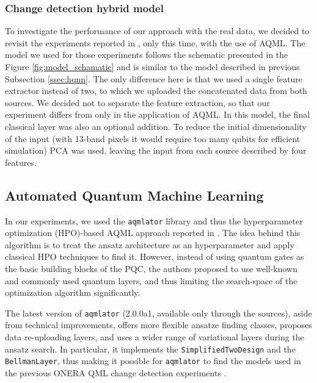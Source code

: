 \documentclass[runningheads]{llncs}
\begin{document}




\subsubsection{Change detection hybrid model}
\label{sssec:qml_onera}


To investigate the performance of our approach with the real data, we decided to revisit the experiments reported in
\cite{QMLCaseStudy}, only this time, with the use of AQML. The model we used for those experiments follows the
schematic presented in the Figure \ref{fig:model_schamatic} and is similar to the model described in previous Subsection
\ref{ssec:hqnn}. The only difference here is that we used a single feature extractor instead of two, to which we uploaded
the concatenated data from both sources. We decided not to separate the feature extraction, so that our experiment
differs from \cite{QMLCaseStudy} only in the application of AQML. In this model, the final classical layer was also
an optional addition. To reduce the initial dimensionality of the input (with 13-band pixels it would require too many
qubits for efficient simulation) PCA was used, leaving the input from each source described by four features.



\subsection{Automated Quantum Machine Learning}

In our experiments, we used the \texttt{aqmlator} library and thus the hyperparameter optimization (HPO)-based AQML
approach reported in \cite{Rybotycki_2025}. The idea behind this algorithm is to treat the ansatz architecture as an
hyperparameter and apply classical HPO techniques to find it. However, instead of using quantum gates as the basic
building blocks of the PQC, the authors proposed to use well-known and commonly used quantum layers, and thus limiting
the search-space of the optimization algorithm significantly.

The latest version of \texttt{aqmlator} (2.0.0a1, available only through the sources), aside from technical
improvements, offers more flexible ansatze finding classes, proposes data re-uploading layers, and uses a wider range
of variational layers during the ansatz search. In particular, it implements the \texttt{SimplifiedTwoDesign} and the
\texttt{BellmanLayer}, thus making it possible for \texttt{aqmlator} to find the models used in the previous ONERA QML
change detection experiments \cite{QMLCaseStudy}.
\end{document}
